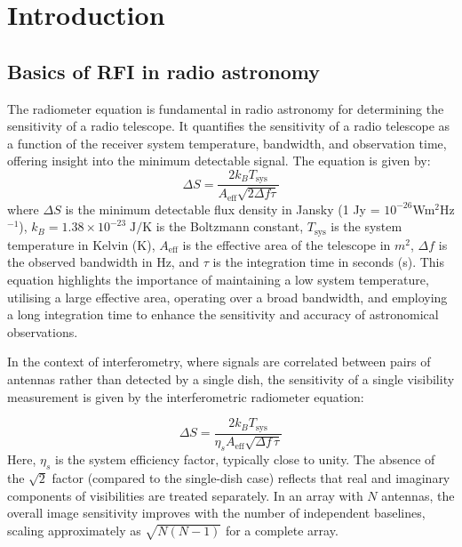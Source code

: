 \section{Introduction}
\label{section:hardware: introduction}


\subsection{Basics of RFI in radio astronomy}
The radiometer equation is fundamental in radio astronomy for determining the sensitivity of a radio telescope. It quantifies the sensitivity of a radio telescope as a function of the receiver system temperature, bandwidth, and observation time, offering insight into the minimum detectable signal. The equation is given by:
\[ \Delta S = \frac{2 k_B T_{\text{sys}}}{A_{\text{eff}} \sqrt{2 \Delta f \tau}} \]
where \( \Delta S \) is the minimum detectable flux density in Jansky (1 Jy = $10^{-26}$Wm$^2$Hz$^{-1}$), \( k_B =1.38 \times 10^{-23} \;\text{J} / \text{K}\) is the Boltzmann constant, \( T_{\text{sys}} \) is the system temperature in Kelvin (K), \( A_{\text{eff}} \) is the effective area of the telescope in $m^2$, \( \Delta f \) is the observed bandwidth in Hz, and \( \tau \) is the integration time in seconds (s). This equation highlights the importance of maintaining a low system temperature, utilising a large effective area, operating over a broad bandwidth, and employing a long integration time to enhance the sensitivity and accuracy of astronomical observations.

In the context of interferometry, where signals are correlated between pairs of antennas rather than detected by a single dish, the sensitivity of a single visibility measurement is given by the interferometric radiometer equation:

\[ \Delta S = \frac{2 k_B T_{\text{sys}}}{\eta_s A_{\text{eff}} \sqrt{ \Delta f \, \tau }} \]
Here, $\eta_s$ is the system efficiency factor, typically close to unity. The absence of the $\sqrt{2}$ factor (compared to the single-dish case) reflects that real and imaginary components of visibilities are treated separately. In an array with $N$ antennas, the overall image sensitivity improves with the number of independent baselines, scaling approximately as $\sqrt{N(N-1)}$ for a complete array.


